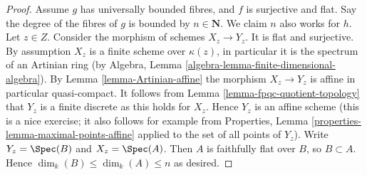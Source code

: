 \begin{proof}
Assume $g$ has universally bounded fibres, and $f$ is surjective and flat.
Say the degree of the fibres of $g$ is bounded by $n \in \mathbf{N}$.
We claim $n$ also works for $h$.
Let $z \in Z$. Consider the morphism of schemes $X_z \to Y_z$.
It is flat and surjective. By assumption $X_z$ is a finite scheme
over $\kappa(z)$, in particular it is the spectrum of an
Artinian ring (by
Algebra, Lemma \ref{algebra-lemma-finite-dimensional-algebra}).
By Lemma \ref{lemma-Artinian-affine} the morphism $X_z \to Y_z$ is affine
in particular quasi-compact. It follows from
Lemma \ref{lemma-fpqc-quotient-topology}
that $Y_z$ is a finite discrete as this holds for $X_z$.
Hence $Y_z$ is an affine scheme (this is a nice exercise; it also follows
for example from
Properties, Lemma \ref{properties-lemma-maximal-points-affine}
applied to the set of all points of $Y_z$).
Write $Y_z = \Spec(B)$ and $X_z = \Spec(A)$.
Then $A$ is faithfully flat over $B$, so $B \subset A$.
Hence $\dim_k(B) \leq \dim_k(A) \leq n$ as desired.
\end{proof}














